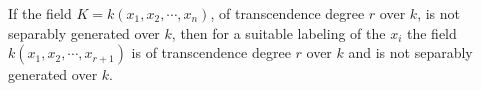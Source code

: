 If the field $K = k(x_1, x_2, \cdots, x_n)$, of transcendence degree $r$ over $k$, is not separably generated over $k$, then for a suitable labeling of the $x_i$ the field $k(x_1, x_2, \cdots, x_{r+1})$ is of transcendence degree $r$ over $k$ and is not separably generated over $k$.

